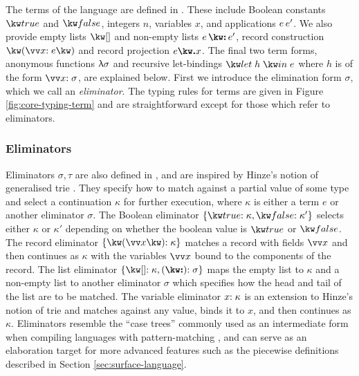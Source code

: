 The terms of the language are defined in . These include Boolean constants $\exTrue$ and $\exFalse$, integers $n$, variables $x$, and applications ${e}\,{e'}$. We also provide empty lists $\exNil$ and non-empty lists $\exCons{e}{e'}$, record construction $\exRec{\vec{\bind{x}{e}}}$ and record projection $\exRecProj{e}{x}$. The final two term forms, anonymous functions $\uplambda{\sigma}$ and recursive let-bindings $\exLetRecMutual{h}{e}$ where $h$ is of the form $\vec{\bind{x}{\sigma}}$, are explained below. First we introduce the elimination form $\sigma$, which we call an \emph{eliminator}. The typing rules for terms are given in Figure \ref{fig:core-typing-term} and are straightforward except for those which refer to eliminators.

\subsubsection{Eliminators}
\label{sec:core-language:syntax-eliminator}
Eliminators $\sigma, \tau$ are also defined in , and are inspired by Hinze's notion of generalised trie \cite{hinze00}. They specify how to match against a partial value of some type and select a continuation $\kappa$ for further execution, where $\kappa$ is either a term $e$ or another eliminator $\sigma$. The Boolean eliminator $\elimBool{\kappa}{\kappa'}$ selects either $\kappa$ or $\kappa'$ depending on whether the boolean value is $\exTrue$ or $\exFalse$. The record eliminator $\elimRec{\seq{x}}{\kappa}$ matches a record with fields $\seq{x}$ and then continues as $\kappa$ with the variables $\seq{x}$ bound to the components of the record. The list eliminator $\elimList{\kappa}{\sigma}$ maps the empty list to $\kappa$ and a non-empty list to another eliminator $\sigma$ which specifies how the head and tail of the list are to be matched. The variable eliminator ${x}{:}\;{\kappa}$ is an extension to Hinze's notion of trie and matches against any value, binds it to $x$, and then continues as $\kappa$. Eliminators resemble the ``case trees'' commonly used as an intermediate form when compiling languages with pattern-matching \cite{graf20}, and can serve as an elaboration target for more advanced features such as the piecewise definitions described in Section \ref{sec:surface-language}.

